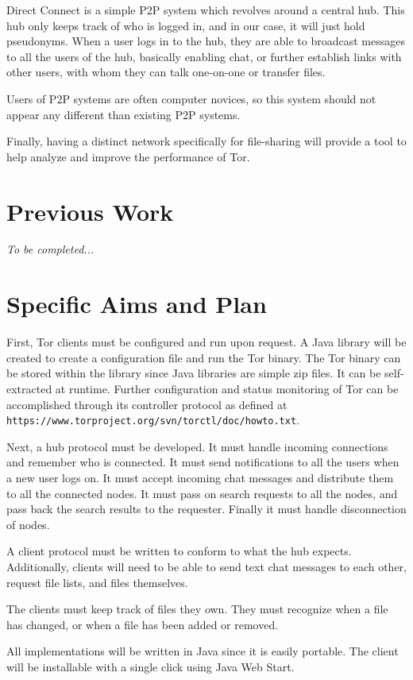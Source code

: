 \documentclass[12pt]{article}
\begin{document}
Direct Connect is a simple P2P system which revolves around a central hub.  This hub only keeps track of who is logged in, and in our case, it will just hold pseudonyms.  When a user logs in to the hub, they are able to broadcast messages to all the users of the hub, basically enabling chat, or further establish links with other users, with whom they can talk one-on-one or transfer files.

Users of P2P systems are often computer novices, so this system should not appear any different than existing P2P systems.

Finally, having a distinct network specifically for file-sharing will provide a tool to help analyze and improve the performance of Tor.

\section{Previous Work}
\emph{To be completed...}

\section{Specific Aims and Plan}
First, Tor clients must be configured and run upon request.  A Java library will be created to create a configuration file and run the Tor binary.  The Tor binary can be stored within the library since Java libraries are simple zip files.  It can be self-extracted at runtime.  Further configuration and status monitoring of Tor can be accomplished through its controller protocol as defined at \verb+https://www.torproject.org/svn/torctl/doc/howto.txt+.

Next, a hub protocol must be developed.  It must handle incoming connections and remember who is connected.  It must send notifications to all the users when a new user logs on.  It must accept incoming chat messages and distribute them to all the connected nodes.  It must pass on search requests to all the nodes, and pass back the search results to the requester.  Finally it must handle disconnection of nodes.

A client protocol must be written to conform to what the hub expects.  Additionally, clients will need to be able to send text chat messages to each other, request file lists, and files themselves.

The clients must keep track of files they own.  They must recognize when a file has changed, or when a file has been added or removed.

All implementations will be written in Java since it is easily portable.  The client will be installable with a single click using Java Web Start.
\end{document}
